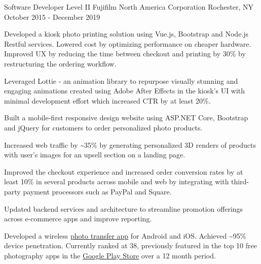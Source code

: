 \begin{cventries}
  \cventry
    {Software Developer Level II} %
    {Fujifilm North America Corporation} %
    {Rochester, NY} %
    {October 2015 - December 2019} %
    {
      \begin{cvitems} %
        \item {Developed a kiosk photo printing solution using Vue.js, Bootstrap and Node.js Restful services. Lowered cost by optimizing performance on cheaper hardware. Improved UX by reducing the time between checkout and printing by 30\% by restructuring the ordering workflow.}
        \item {Leveraged Lottie - an animation library to repurpose visually stunning and engaging animations created using Adobe After Effects in the kiosk's UI with minimal development effort which increased CTR by at least 20\%.}
        \item {Built a mobile-first responsive design website using ASP.NET Core, Bootstrap and jQuery for customers to order personalized photo products.}
        \item {Increased web traffic by \textasciitilde35\% by generating personalized 3D renders of products with user's images for an upsell section on a landing page.}
        \item {Improved the checkout experience and increased order conversion rates by at least 10\% in several products across mobile and web by integrating with third-party payment processors such as PayPal and Square.}
        \item {Updated backend services and architecture to streamline promotion offerings across e-commerce apps and improve reporting.}
        \item {Developed a wireless \href{https://play.google.com/store/apps/details?id=com.fujifilm.wifi}{photo transfer app} for Android and iOS. Achieved \textasciitilde95\% device penetration. Currently ranked at 38, previously featured in the top 10 free photography apps in the \href{https://play.google.com/store/apps/category/PHOTOGRAPHY/collection/topselling_free}{Google Play Store} over a 12 month period.}

\end{cvitems}}
\end{cventries}
